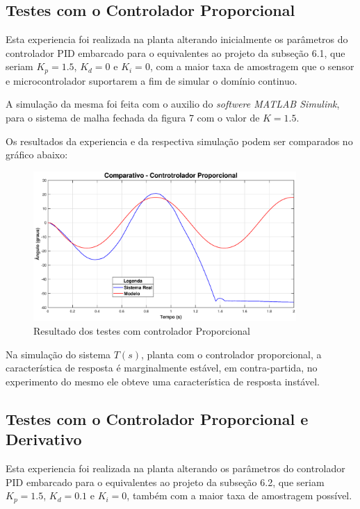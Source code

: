 \documentclass[conference,harvard,brazil,english]{sbatex}
\begin{document}
        \subsection{Testes com o Controlador Proporcional}
            
            Esta experiencia foi realizada na planta alterando inicialmente os parâmetros do controlador PID embarcado para o equivalentes ao projeto da subseção 6.1, que seriam $K_p=1.5$, $K_d=0$ e $K_i=0$, com a maior taxa de amostragem que o sensor e microcontrolador suportarem a fim de simular o domínio continuo.
            
            A simulação da mesma foi feita com o auxilio do \textit{softwere MATLAB Simulink}, para o sistema de malha fechada da figura 7 com o valor de $K=1.5$.
            
            Os resultados da experiencia e da respectiva simulação podem ser comparados no gráfico abaixo:
            
            \begin{figure}[h]
                \hspace{-15mm}
                \includegraphics[width=10cm]{imagens/graficos/ComparativoP.eps}
                \caption{Resultado dos testes com controlador Proporcional}
            \end{figure}
            
            Na simulação do sistema $T(s)$, planta com o controlador proporcional, a característica de resposta é marginalmente estável, em contra-partida, no experimento do mesmo ele obteve uma característica de resposta instável.
            
        \subsection{Testes com o Controlador Proporcional e Derivativo}
            
            Esta experiencia foi realizada na planta alterando os parâmetros do controlador PID embarcado para o equivalentes ao projeto da subseção 6.2, que seriam $K_p=1.5$, $K_d=0.1$ e $K_i=0$, também com a maior taxa de amostragem possível.
            
\end{document}
